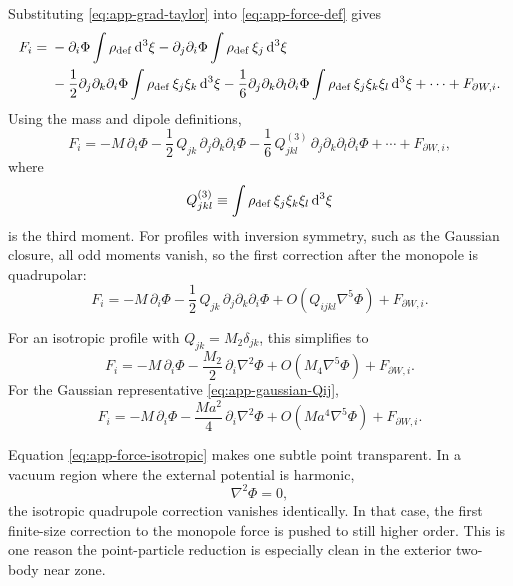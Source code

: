 \documentclass[11pt]{article}
\newcommand{\dd}{\mathrm d}
\newcommand{\PhiN}{\Phi}
\begin{document}
Substituting \eqref{eq:app-grad-taylor} into \eqref{eq:app-force-def} gives
\begin{align}
F_i
={}&
-\partial_i\PhiN \int \rho_{\rm def}\,\dd^3\xi
-\partial_j\partial_i\PhiN \int \rho_{\rm def}\,\xi_j\,\dd^3\xi
\nonumber\\
&
-\frac12\partial_j\partial_k\partial_i\PhiN
\int \rho_{\rm def}\,\xi_j\xi_k\,\dd^3\xi
-\frac{1}{6}\partial_j\partial_k\partial_l\partial_i\PhiN
\int \rho_{\rm def}\,\xi_j\xi_k\xi_l\,\dd^3\xi
+\cdots
+
F_{\partial W,i}.
\label{eq:app-force-expanded-raw}
\end{align}
Using the mass and dipole definitions,
\begin{equation}
F_i
=
- M\,\partial_i\PhiN
-\frac12\,Q_{jk}\,\partial_j\partial_k\partial_i\PhiN
-\frac{1}{6}\,Q_{jkl}^{(3)}\,\partial_j\partial_k\partial_l\partial_i\PhiN
+\cdots
+
F_{\partial W,i},
\label{eq:app-force-multipole}
\end{equation}
where
\begin{equation}
Q_{jkl}^{(3)}
\equiv
\int \rho_{\rm def}\,\xi_j\xi_k\xi_l\,\dd^3\xi
\label{eq:app-third-moment}
\end{equation}
is the third moment. For profiles with inversion symmetry, such as the Gaussian closure,
all odd moments vanish, so the first correction after the monopole is quadrupolar:
\begin{equation}
F_i
=
- M\,\partial_i\PhiN
-\frac12\,Q_{jk}\,\partial_j\partial_k\partial_i\PhiN
+O(Q_{ijkl}\nabla^5\PhiN)
+
F_{\partial W,i}.
\label{eq:app-force-quadrupole}
\end{equation}

For an isotropic profile with \(Q_{jk}=M_2\delta_{jk}\), this simplifies to
\begin{equation}
F_i
=
- M\,\partial_i\PhiN
-\frac{M_2}{2}\,\partial_i\nabla^2\PhiN
+O(M_4\nabla^5\PhiN)
+
F_{\partial W,i}.
\label{eq:app-force-isotropic}
\end{equation}
For the Gaussian representative \eqref{eq:app-gaussian-Qij},
\begin{equation}
F_i
=
- M\,\partial_i\PhiN
-\frac{Ma^2}{4}\,\partial_i\nabla^2\PhiN
+O(Ma^4\nabla^5\PhiN)
+
F_{\partial W,i}.
\label{eq:app-force-gaussian}
\end{equation}

Equation \eqref{eq:app-force-isotropic} makes one subtle point transparent. In a vacuum
region where the external potential is harmonic,
\begin{equation}
\nabla^2\PhiN=0,
\label{eq:app-harmonic-vacuum}
\end{equation}
the isotropic quadrupole correction vanishes identically. In that case, the first
finite-size correction to the monopole force is pushed to still higher order. This is one
reason the point-particle reduction is especially clean in the exterior two-body near
zone.
\end{document}
